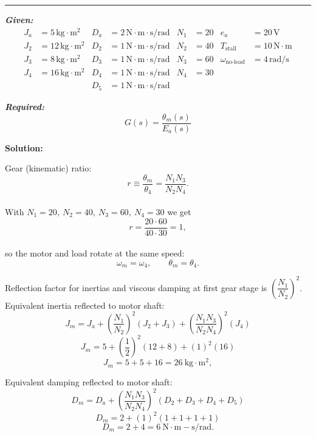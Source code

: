 \documentclass[11pt]{article}
\begin{document}
\noindent\rule{\textwidth}{1pt}

\vspace{12pt}

\noindent\textbf{\textit{Given:}}
\[
\begin{aligned}
J_a &= 5\, \text{kg}\cdot\text{m}^2 & D_a &= 2\, \text{N}\cdot\text{m}\cdot\text{s/rad} & N_1 &= 20 & e_a &= 20\,\text{V} \\
J_2 &= 12\, \text{kg}\cdot\text{m}^2 & D_2 &= 1\, \text{N}\cdot\text{m}\cdot\text{s/rad} & N_2 &= 40 & T_{\text{stall}} &= 10\,\text{N}\cdot\text{m} \\
J_3 &= 8\, \text{kg}\cdot\text{m}^2 & D_3 &= 1\, \text{N}\cdot\text{m}\cdot\text{s/rad} & N_3 &= 60 & \omega_{\text{no-load}} &= 4\,\text{rad/s} \\
J_4 &= 16\, \text{kg}\cdot\text{m}^2 & D_4 &= 1\, \text{N}\cdot\text{m}\cdot\text{s/rad} & N_4 &= 30 & & \\
& & D_5 &= 1\, \text{N}\cdot\text{m}\cdot\text{s/rad} & & & &
\end{aligned}
\]

\vspace{12pt}

\noindent\textbf{\textit{Required:}}
\[
G(s) = \frac{\theta_m(s)}{E_a(s)}
\]

\vspace{12pt}

\noindent \textbf{Solution:}

Gear (kinematic) ratio:
\[
r \equiv \frac{\theta_m}{\theta_4}=\frac{N_1 N_3}{N_2 N_4}.
\]  \\

With \(N_1=20,\ N_2=40,\ N_3=60,\ N_4=30\) we get
\[
r=\frac{20 \cdot 60}{40 \cdot 30}=1,
\] \\

so the motor and load rotate at the same speed:
\[
\omega_m = \omega_4,\qquad \theta_m = \theta_4.
\]

Reflection factor for inertias and viscous damping at first gear stage is \(\left(\dfrac{N_1}{N_2}\right)^2\). \\

Equivalent inertia reflected to motor shaft:
\[
J_m = J_a + \left(\frac{N_1}{N_2}\right)^2 (J_2 + J_3) + \left(\frac{N_1 N_3}{N_2 N_4}\right)^2 (J_4)
\]
\[
J_m = 5 + \left(\frac{1}{2}\right)^2 (12 + 8) + (1)^2 (16)
\]
\[
J_m = 5 + 5 + 16 = 26\ \mathrm{kg\cdot m^2},
\]

Equivalent damping reflected to motor shaft:
\[
D_m = D_a + \left(\frac{N_1 N_3}{N_2 N_4}\right)^2 (D_2 + D_3 + D_4 + D_5)
\]
\[
D_m = 2 + (1)^2 (1 + 1 + 1 + 1)
\]
\[
D_m = 2 + 4 = 6\ \mathrm{N\cdot m\!-\!s/rad}.
\]
\end{document}
